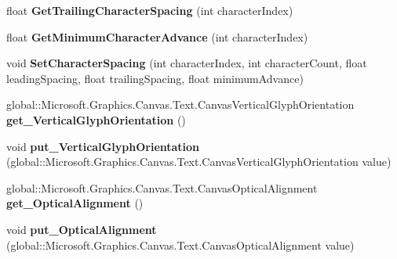 \begin{DoxyCompactItemize}
float {\bfseries Get\+Trailing\+Character\+Spacing} (int character\+Index)
\item 
\mbox{\label{class_microsoft_1_1_graphics_1_1_canvas_1_1_text_1_1_canvas_text_layout_ae70042fca13d7c261dea65b89cbbae5d}} 
float {\bfseries Get\+Minimum\+Character\+Advance} (int character\+Index)
\item 
\mbox{\label{class_microsoft_1_1_graphics_1_1_canvas_1_1_text_1_1_canvas_text_layout_a738825e42cca183687361df02597990c}} 
void {\bfseries Set\+Character\+Spacing} (int character\+Index, int character\+Count, float leading\+Spacing, float trailing\+Spacing, float minimum\+Advance)
\item 
\mbox{\label{class_microsoft_1_1_graphics_1_1_canvas_1_1_text_1_1_canvas_text_layout_afd275d5017f0ed4abf5747b6611ba137}} 
global\+::\+Microsoft.\+Graphics.\+Canvas.\+Text.\+Canvas\+Vertical\+Glyph\+Orientation {\bfseries get\+\_\+\+Vertical\+Glyph\+Orientation} ()
\item 
\mbox{\label{class_microsoft_1_1_graphics_1_1_canvas_1_1_text_1_1_canvas_text_layout_a45f5e962fa229c96404257c75c6a3a3c}} 
void {\bfseries put\+\_\+\+Vertical\+Glyph\+Orientation} (global\+::\+Microsoft.\+Graphics.\+Canvas.\+Text.\+Canvas\+Vertical\+Glyph\+Orientation value)
\item 
\mbox{\label{class_microsoft_1_1_graphics_1_1_canvas_1_1_text_1_1_canvas_text_layout_a9de04b11cf865c89c4a76010e49b21ac}} 
global\+::\+Microsoft.\+Graphics.\+Canvas.\+Text.\+Canvas\+Optical\+Alignment {\bfseries get\+\_\+\+Optical\+Alignment} ()
\item 
\mbox{\label{class_microsoft_1_1_graphics_1_1_canvas_1_1_text_1_1_canvas_text_layout_af03396a3ef4783d99224c7d1ed1fb4c8}} 
void {\bfseries put\+\_\+\+Optical\+Alignment} (global\+::\+Microsoft.\+Graphics.\+Canvas.\+Text.\+Canvas\+Optical\+Alignment value)
\item 

\end{DoxyCompactItemize}

